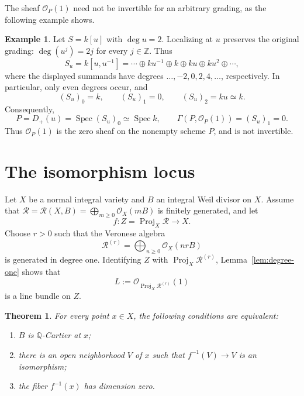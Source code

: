 \documentclass[11pt,a4paper]{article}
\newtheorem{theorem}[lemma]{Theorem}
\theoremstyle{definition}
\theoremstyle{definition}
\newtheorem{example}[lemma]{Example}
\DeclareMathOperator{\Spec}{Spec}
\DeclareMathOperator{\Proj}{Proj}
\newcommand{\OO}{\mathcal O}
\newcommand{\RR}{\mathcal R}
\begin{document}
The sheaf $\OO_P(1)$ need not be invertible for an arbitrary grading, as the following example shows.

\begin{example}\label{ex:degree-two}
Let $S=k[u]$ with $\deg u=2$. Localizing at $u$ preserves the original grading: $\deg(u^j)=2j$ for every $j\in\mathbb Z$. Thus
\[
 S_u=k[u,u^{-1}]
 =\cdots\oplus ku^{-1}\oplus k\oplus ku\oplus ku^2\oplus\cdots,
\]
where the displayed summands have degrees $\ldots,-2,0,2,4,\ldots$, respectively. In particular, only even degrees occur, and
\[
 (S_u)_0=k,\qquad (S_u)_1=0,\qquad (S_u)_2=ku\simeq k.
\]
Consequently,
\[
 P=D_+(u)=\Spec(S_u)_0\simeq\Spec k,
 \qquad
 \Gamma(P,\OO_P(1))=(S_u)_1=0.
\]
Thus $\OO_P(1)$ is the zero sheaf on the nonempty scheme $P$, and is not invertible.
\end{example}

\section{The isomorphism locus}

Let $X$ be a normal integral variety and $B$ an integral Weil divisor on $X$. Assume that $\RR=\RR(X,B)=\bigoplus_{m\ge0}\OO_X(mB)$ is finitely generated, and let
\[
 f\colon Z=\Proj_X\RR\longrightarrow X.
\]
Choose $r>0$ such that the Veronese algebra
\[
 \RR^{(r)}=\bigoplus_{n\ge0}\OO_X(nrB)
\]
is generated in degree one. Identifying $Z$ with $\Proj_X\RR^{(r)}$, Lemma~\ref{lem:degree-one} shows that
\[
 L:=\OO_{\Proj_X\RR^{(r)}}(1)
\]
is a line bundle on $Z$.

\begin{theorem}\label{prop:isomorphism-locus}
For every point $x\in X$, the following conditions are equivalent:
\begin{enumerate}
 \item $B$ is $\mathbb Q$-Cartier at $x$;
 \item there is an open neighborhood $V$ of $x$ such that $f^{-1}(V)\to V$ is an isomorphism;
 \item the fiber $f^{-1}(x)$ has dimension zero.
\end{enumerate}
\end{theorem}
\end{document}
